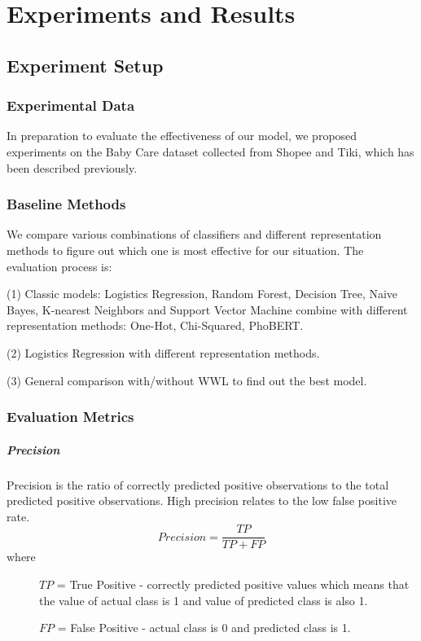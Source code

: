 \chapter{Experiments and Results}
\label{chap:experiments}

\section{Experiment Setup}
\subsection{Experimental Data}
In preparation to evaluate the effectiveness of our model, we proposed experiments on the Baby Care dataset collected from Shopee and Tiki, which has been described previously.
\subsection{Baseline Methods}
We compare various combinations of classifiers and different representation methods to figure out which one is most effective for our situation. The evaluation process is:

(1) Classic models: Logistics Regression, Random Forest, Decision Tree, Naive Bayes, K-nearest Neighbors and Support Vector Machine combine with different representation methods: One-Hot, Chi-Squared, PhoBERT.

(2) Logistics Regression with different representation methods.

(3) General comparison with/without WWL to find out the best model.

\subsection{Evaluation Metrics}
\paragraph{Precision}
Precision is the ratio of correctly predicted positive observations to the total predicted positive observations.
High precision relates to the low false positive rate.
\begin{equation}
Precision = \frac{TP}{TP+FP}
\end{equation}
where
\begin{description}
\item[] \(TP\) = True Positive - correctly predicted positive values which means that the value of actual class is 1 and value of predicted class is also 1.
\item[] \(FP\) = False Positive - actual class is 0 and predicted class is 1.
\end{description}
